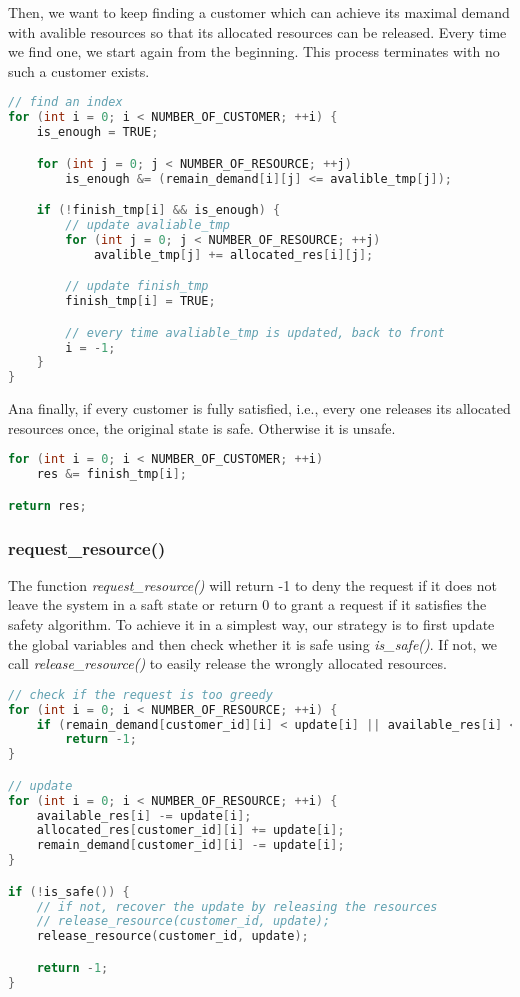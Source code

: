 \documentclass{article}
\begin{document}
Then, we want to keep finding a customer which can achieve its maximal demand with avalible resources so that its allocated resources can be released. Every time we find one, we start again from the beginning. This process terminates with no such a customer exists. 

\begin{lstlisting}[language=c, caption={is\_safe() II}]
// find an index
for (int i = 0; i < NUMBER_OF_CUSTOMER; ++i) {
    is_enough = TRUE;

    for (int j = 0; j < NUMBER_OF_RESOURCE; ++j)
        is_enough &= (remain_demand[i][j] <= avalible_tmp[j]);

    if (!finish_tmp[i] && is_enough) {
        // update avaliable_tmp
        for (int j = 0; j < NUMBER_OF_RESOURCE; ++j) 
            avalible_tmp[j] += allocated_res[i][j];

        // update finish_tmp
        finish_tmp[i] = TRUE;

        // every time avaliable_tmp is updated, back to front
        i = -1;
    }
}
\end{lstlisting}

Ana finally, if every customer is fully satisfied, i.e., every one releases its allocated resources once, the original state is safe. Otherwise it is unsafe.

\begin{lstlisting}[language=c, caption={is\_safe() III}]
for (int i = 0; i < NUMBER_OF_CUSTOMER; ++i) 
    res &= finish_tmp[i];

return res;
\end{lstlisting}

\subsubsection*{request\_resource()}
The function \textit{request\_resource()} will return -1 to deny the request if it does not leave the system in a saft state or return 0 to grant a request if it satisfies the safety algorithm. To achieve it in a simplest way, our strategy is to first update the global variables and then check whether it is safe using \textit{is\_safe()}. If not, we call \textit{release\_resource()} to easily release the wrongly allocated resources.

\begin{lstlisting}[language=c, caption={request\_resource() I}]
// check if the request is too greedy
for (int i = 0; i < NUMBER_OF_RESOURCE; ++i) {
    if (remain_demand[customer_id][i] < update[i] || available_res[i] < update[i])
        return -1;
}

// update
for (int i = 0; i < NUMBER_OF_RESOURCE; ++i) {
    available_res[i] -= update[i];
    allocated_res[customer_id][i] += update[i];
    remain_demand[customer_id][i] -= update[i];
}

if (!is_safe()) {
    // if not, recover the update by releasing the resources
    // release_resource(customer_id, update);
    release_resource(customer_id, update);

    return -1;
}
\end{lstlisting}
\end{document}

